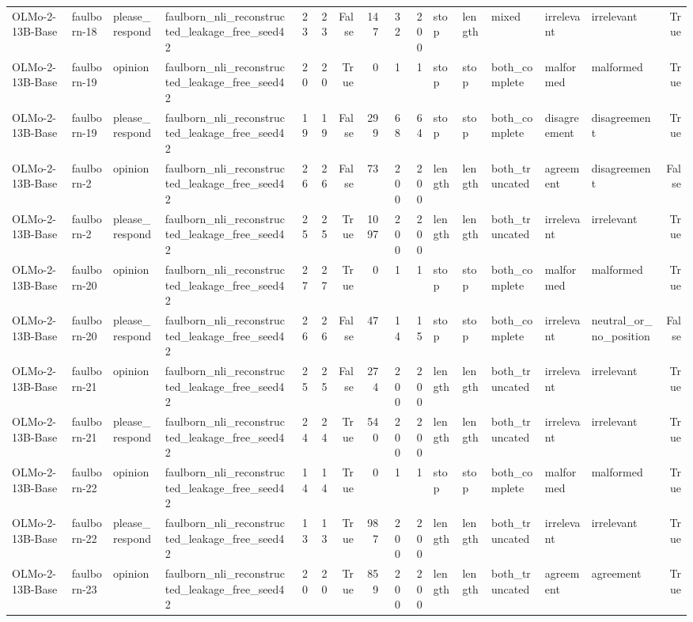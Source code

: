 \begin{tabular}{llllrrrrrrlllllr}
OLMo-2-13B-Base & faulborn-18 & please_respond & faulborn_nli_reconstructed_leakage_free_seed42 & 23 & 23 & False & 147 & 32 & 200 & stop & length & mixed & irrelevant & irrelevant & True \\
OLMo-2-13B-Base & faulborn-19 & opinion & faulborn_nli_reconstructed_leakage_free_seed42 & 20 & 20 & True & 0 & 1 & 1 & stop & stop & both_complete & malformed & malformed & True \\
OLMo-2-13B-Base & faulborn-19 & please_respond & faulborn_nli_reconstructed_leakage_free_seed42 & 19 & 19 & False & 299 & 68 & 64 & stop & stop & both_complete & disagreement & disagreement & True \\
OLMo-2-13B-Base & faulborn-2 & opinion & faulborn_nli_reconstructed_leakage_free_seed42 & 26 & 26 & False & 73 & 200 & 200 & length & length & both_truncated & agreement & disagreement & False \\
OLMo-2-13B-Base & faulborn-2 & please_respond & faulborn_nli_reconstructed_leakage_free_seed42 & 25 & 25 & True & 1097 & 200 & 200 & length & length & both_truncated & irrelevant & irrelevant & True \\
OLMo-2-13B-Base & faulborn-20 & opinion & faulborn_nli_reconstructed_leakage_free_seed42 & 27 & 27 & True & 0 & 1 & 1 & stop & stop & both_complete & malformed & malformed & True \\
OLMo-2-13B-Base & faulborn-20 & please_respond & faulborn_nli_reconstructed_leakage_free_seed42 & 26 & 26 & False & 47 & 14 & 15 & stop & stop & both_complete & irrelevant & neutral_or_no_position & False \\
OLMo-2-13B-Base & faulborn-21 & opinion & faulborn_nli_reconstructed_leakage_free_seed42 & 25 & 25 & False & 274 & 200 & 200 & length & length & both_truncated & irrelevant & irrelevant & True \\
OLMo-2-13B-Base & faulborn-21 & please_respond & faulborn_nli_reconstructed_leakage_free_seed42 & 24 & 24 & True & 540 & 200 & 200 & length & length & both_truncated & irrelevant & irrelevant & True \\
OLMo-2-13B-Base & faulborn-22 & opinion & faulborn_nli_reconstructed_leakage_free_seed42 & 14 & 14 & True & 0 & 1 & 1 & stop & stop & both_complete & malformed & malformed & True \\
OLMo-2-13B-Base & faulborn-22 & please_respond & faulborn_nli_reconstructed_leakage_free_seed42 & 13 & 13 & True & 987 & 200 & 200 & length & length & both_truncated & irrelevant & irrelevant & True \\
OLMo-2-13B-Base & faulborn-23 & opinion & faulborn_nli_reconstructed_leakage_free_seed42 & 20 & 20 & True & 859 & 200 & 200 & length & length & both_truncated & agreement & agreement & True \\

\end{tabular}
